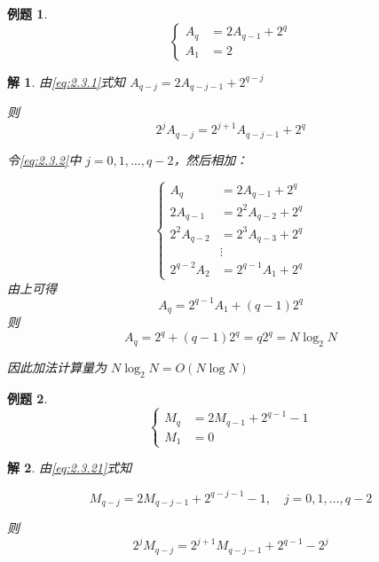 \documentclass[12pt,a4paper]{article}
\numberwithin{subsection}{section}   %
\numberwithin{subsubsection}{subsection}
\theoremstyle{plain}
\newtheorem{solution}{解}[subsection]  %
\theoremstyle{definition}
\newtheorem{example}{例题}[subsection]  %
\theoremstyle{remark}
\theoremstyle{remark}
\begin{document}
	\begin{example}
	\begin{equation}\label{eq:2.3.1}
		\left\{
		\begin{aligned}
			A_q &= 2 A_{q-1} + 2^q  \\[8pt]
			A_1 &= 2
		\end{aligned}
		\right.
	\end{equation}
	\end{example}
	
	\begin{solution}
	由\eqref{eq:2.3.1}式知 \(A_{q-j} = 2 A_{q-j-1} + 2^{q-j}\)
	
	则
	\begin{equation}\label{eq:2.3.2}
	2^j A_{q-j} = 2^{j+1} A_{q-j-1} + 2^q 
	\end{equation}
	
	
	令\eqref{eq:2.3.2}中 \(j = 0,1,\ldots,q-2\)，然后相加：
	
\begin{equation}
	\left\{
	\begin{aligned}
		A_q &= 2 A_{q-1} + 2^q \\[8pt]
		2 A_{q-1} &= 2^2 A_{q-2} + 2^q \\[8pt]
		2^2 A_{q-2} &= 2^3 A_{q-3} + 2^q \\[8pt]
		&\vdots \\[8pt]
		2^{q-2} A_2 &= 2^{q-1} A_1 + 2^q
	\end{aligned}
	\right.
\end{equation}
	由上可得
		\begin{equation}
	 A_q = 2^{q-1} A_1 + (q-1) 2^q
		\end{equation}
		则 
		\begin{equation}
		A_q = 2^q + (q-1) 2^q = q 2^q = N \log_2 N
	\end{equation}
		
		因此加法计算量为 \(N \log_2 N = O(N \log N)\)
	
	
	\end{solution}

	
	
		\begin{example}
	
	
	\begin{equation}\label{eq:2.3.21}
		\left\{
		\begin{aligned}
			M_q &= 2 M_{q-1} + 2^{q-1} -1 \\[8pt]
			M_1 &= 0
		\end{aligned}
		\right.
	\end{equation}
	
		\end{example}
	
		\begin{solution}
	由\eqref{eq:2.3.21}式知 
	
	\begin{equation}
	M_{q-j} = 2 M_{q-j-1} + 2^{q -j -1} -1, \quad j=0,1,\ldots,q-2
\end{equation}
	
	则
	\begin{equation}
	 2^j M_{q-j} = 2^{j+1} M_{q-j-1} + 2^{q-1} - 2^j
\end{equation}
	
		\end{solution}
	
\end{document}
